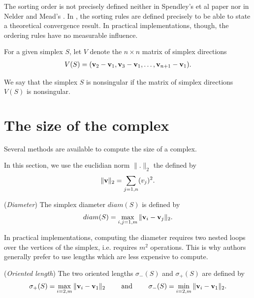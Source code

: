 The sorting order is not precisely defined neither in Spendley's et al paper \cite{Spendley1962}
nor in Nelder and Mead's \cite{citeulike:3009487}. 
In \cite{lagarias:112}, the sorting rules are defined precisely to be able to 
state a theoretical convergence result. In practical implementations, though, the 
ordering rules have no measurable influence.

For a given simplex $S$, let $V$ denote the 
$n\times n$ matrix of simplex directions 
\begin{eqnarray}
\label{simplex-directions}
V(S) = (\mathbf{v}_2 - \mathbf{v}_1, \mathbf{v}_3 - \mathbf{v}_1 , \ldots , \mathbf{v}_{n+1} - \mathbf{v}_1).
\end{eqnarray}

We say that the simplex $S$ is nonsingular if the matrix of simplex directions $V(S)$ is nonsingular.

\section{The size of the complex}
\label{section-simplexsize}

Several methods are available to compute the size of a complex.

In this section, we use  the euclidian norm $\|.\|_2$ 
the defined by 
\begin{eqnarray}
\|\mathbf{v}\|_2 = \sum_{j=1,n}(v_j)^2.
\end{eqnarray}

\begin{definition}
(\emph{Diameter})
The simplex diameter $diam(S)$ is defined by 
\begin{eqnarray}
\label{simplex-diameter}
diam(S) = \max_{i,j=1,m} \|\mathbf{v}_i - \mathbf{v}_j\|_2.
\end{eqnarray}
\end{definition}

In practical implementations, computing the diameter 
requires two nested loops over the 
vertices of the simplex, i.e. requires $m^2$ 
operations. This is why authors generally 
prefer to use lengths which are less expensive 
to compute.

\begin{definition}
(\emph{Oriented length})
The two oriented lengths $\sigma_-(S)$ and 
$\sigma_+(S)$ are defined by 
\begin{eqnarray}
\label{simplex-sigma}
\sigma_+(S) = \max_{i=2,m} \|\mathbf{v}_i - \mathbf{v}_1\|_2 
\qquad \textrm { and } \qquad \sigma_-(S) = \min_{i=2,m} \|\mathbf{v}_i - \mathbf{v}_1\|_2.
\end{eqnarray}
\end{definition}

